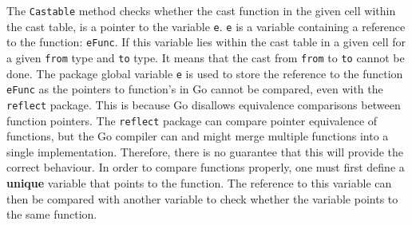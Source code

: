 The \verb|Castable| method checks whether the cast function in the given cell within the cast table, is a pointer to the variable \verb|e|. \verb|e| is a variable containing a reference to the function: \verb|eFunc|. If this variable lies within the cast table in a given cell for a given \verb|from| type and \verb|to| type. It means that the cast from \verb|from| to \verb|to| cannot be done. The package global variable \verb|e| is used to store the reference to the function \verb|eFunc| as the pointers to function's in Go cannot be compared, even with the \verb|reflect| package. This is because Go disallows equivalence comparisons between function pointers. The \verb|reflect| package can compare pointer equivalence of functions, but the Go compiler can and might merge multiple functions into a single implementation. Therefore, there is no guarantee that this will provide the correct behaviour. In order to compare functions properly, one must first define a \textbf{unique} variable that points to the function. The reference to this variable can then be compared with another variable to check whether the variable points to the same function.

